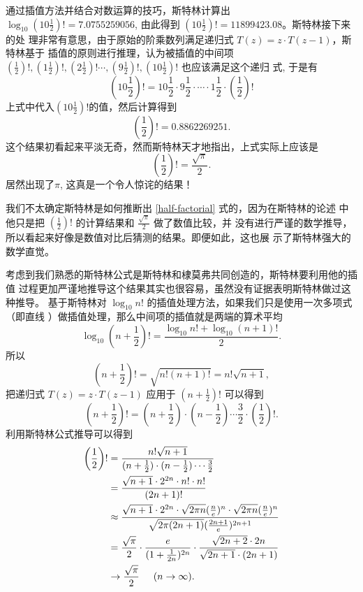 {通过插值方法并结合对数运算的技巧，斯特林计算出 $\log_{10} (10\frac{1}{2})!=
7.0755259056$, 由此得到 $(10\frac{1}{2})! = 11899423.08$。斯特林接下来的处
理非常有意思，由于原始的阶乘数列满足递归式 $T(z) = z \cdot T(z-1)$，斯特林基于
插值的原则进行推理，认为被插值的中间项 $(\frac{1}{2})!, (1\frac{1}{2})!,
(2\frac{1}{2})!  \cdots, (9\frac{1}{2})!, (10\frac{1}{2})!$ 也应该满足这个递归
式, 于是有 
$$ \left(10\frac{1}{2}\right)! = 10\frac{1}{2} \cdot
9\frac{1}{2} \cdot  \cdots \cdot  1\frac{1}{2} \cdot \left(\frac{1}{2}\right)! $$ 
上式中代入$(10\frac{1}{2})!$的值，然后计算得到 
$$\left(\frac{1}{2}\right)! = 0.8862269251 .$$
这个结果初看起来平淡无奇，然而斯特林天才地指出，上式实际上应该是
\begin{equation}
\label{half-factorial}
\left(\frac{1}{2}\right)! = \frac{\sqrt\pi}{2} .
\end{equation}
居然出现了$\pi$, 这真是一个令人惊诧的结果！

我们不太确定斯特林是如何推断出 \eqref{half-factorial} 式的，因为在斯特林的论述
中他只是把 $(\frac{1}{2})!$ 的计算结果和 $\frac{\sqrt\pi}{2}$ 做了数值比较，并
没有进行严谨的数学推导，所以看起来好像是数值对比后猜测的结果。即便如此，这也展
示了斯特林强大的数学直觉。

考虑到我们熟悉的斯特林公式是斯特林和棣莫弗共同创造的，斯特林要利用他的插值
过程更加严谨地推导这个结果其实也很容易，虽然没有证据表明斯特林做过这种推导。
基于斯特林对 $\log_{10} n!$ 的插值处理方法，如果我们只是使用一次多项式（即直线
）做插值处理，那么中间项的插值就是两端的算术平均
$$ \log_{10} \left(n+\frac{1}{2}\right)! = \frac{\log_{10} n! + \log_{10} (n+1)!}{2} .$$
所以
$$ \left(n+\frac{1}{2}\right)! = \sqrt{n! (n+1)!} = n! \sqrt{n+1} ,$$
把递归式 $T(z) = z \cdot T(z-1)$ 应用于 $(n+\frac{1}{2})!$ 可以得到
$$ \left(n+\frac{1}{2}\right)! 
= (n+\frac{1}{2}) \cdot (n-\frac{1}{2}) \cdots \frac{3}{2} \cdot \left(\frac{1}{2}\right)! .$$
利用斯特林公式推导可以得到
\begin{align*}
\left(\frac{1}{2}\right)! & = \frac {n! \sqrt{n+1}} {(n+\frac{1}{2}) 
\cdot (n-\frac{1}{2}) \cdots \frac{3}{2}} \\
& = \frac {\sqrt{n+1} \cdot 2^{2n} \cdot n! \cdot n!} {(2n+1)!}  \\
& \displaystyle \approx \displaystyle \frac {\sqrt{n+1} \cdot 2^{2n}  
\cdot \sqrt{2\pi n} (\frac{n}{e})^n \cdot \sqrt{2\pi n} (\frac{n}{e})^n} 
{\sqrt{2\pi(2n+1)} (\frac{2n+1}{e})^{2n+1}} \\
& = \displaystyle \frac{\sqrt\pi}{2} \cdot \frac{e}{(1+\frac{1}{2n})^{2n}}  
\cdot \frac{\sqrt{2n+2}\cdot 2n}{\sqrt{2n+1}\cdot (2n+1)} \\
& \rightarrow \frac{\sqrt\pi}{2} \hspace{0.5cm} (n \rightarrow \infty) .
\end{align*}

}
